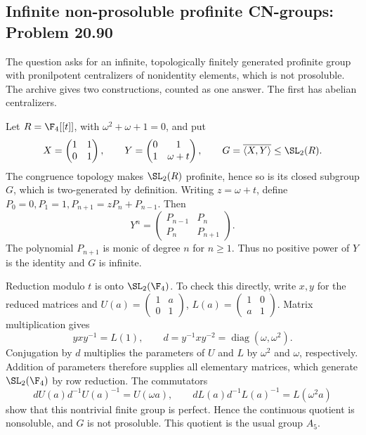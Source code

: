 \subsection{Infinite non-prosoluble profinite CN-groups: Problem 20.90}
\label{cand:20.90}

The question asks for an infinite, topologically finitely generated
profinite group with pronilpotent centralizers of nonidentity elements,
which is not prosoluble. The archive gives two constructions, counted
as one answer. The first has abelian centralizers.

Let \(R=\F_4[[t]]\), with \(\omega^2+\omega+1=0\), and put
\[
 X=\begin{pmatrix}1&1\\0&1\end{pmatrix},\qquad
 Y=\begin{pmatrix}0&1\\1&\omega+t\end{pmatrix},\qquad
 G=\overline{\langle X,Y\rangle}\leq\SL_2(R).
\]
The congruence topology makes \(\SL_2(R)\) profinite, hence so
is its closed subgroup \(G\), which is two-generated by definition.
Writing \(z=\omega+t\), define
\(P_0=0,P_1=1,P_{n+1}=zP_n+P_{n-1}\). Then
\[
 Y^n=\begin{pmatrix}P_{n-1}&P_n\\P_n&P_{n+1}\end{pmatrix}.
\]
The polynomial \(P_{n+1}\) is monic of degree \(n\) for \(n\geq1\).
Thus no positive power of \(Y\) is the identity and \(G\) is infinite.

Reduction modulo \(t\) is onto \(\SL_2(\F_4)\). To check this
directly, write \(x,y\) for the reduced matrices and
\(U(a)=\left(\begin{smallmatrix}1&a\\0&1\end{smallmatrix}\right)\),
\(L(a)=\left(\begin{smallmatrix}1&0\\a&1\end{smallmatrix}\right)\).
Matrix multiplication gives
\[
 yxy^{-1}=L(1),\qquad
 d=y^{-1}xy^{-2}=\operatorname{diag}(\omega,\omega^2).
\]
Conjugation by \(d\) multiplies the parameters of \(U\) and \(L\)
by \(\omega^2\) and \(\omega\), respectively. Addition of
parameters therefore supplies all elementary matrices, which
generate \(\SL_2(\F_4)\) by row reduction. The commutators
\[
 dU(a)d^{-1}U(a)^{-1}=U(\omega a),\qquad
 dL(a)d^{-1}L(a)^{-1}=L(\omega^2a)
\]
show that this nontrivial finite group is perfect. Hence the
continuous quotient is nonsoluble, and \(G\) is not prosoluble.
This quotient is the usual group \(A_5\).

